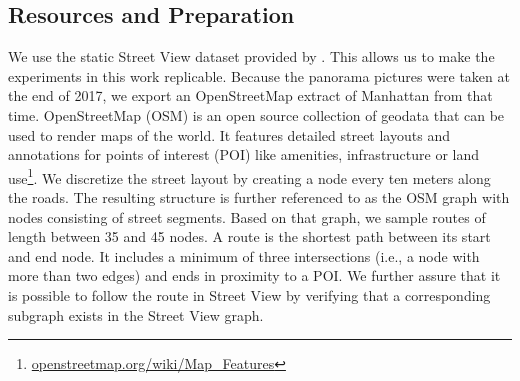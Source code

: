 \documentclass[11pt,a4paper]{article}
\begin{document}
\subsection{Resources and Preparation}
\label{sec:res_and_prep}
We use the static Street View dataset provided by \citet{chen-etal-2019-touchdown}. This allows us to make the experiments in this work replicable. Because the panorama pictures were taken at the end of 2017, we export an OpenStreetMap extract of Manhattan from that time. OpenStreetMap (OSM) is an open source collection of geodata that can be used to render maps of the world. It features detailed street layouts and annotations for points of interest (POI) like amenities, infrastructure or land use\footnote{\url{openstreetmap.org/wiki/Map_Features}}.
We discretize the street layout by creating a node every ten meters along the roads. The resulting structure is further referenced to as the OSM graph with nodes consisting of street segments. Based on that graph, we sample routes of length between 35 and 45 nodes. A route is the shortest path between its start and end node. It includes a minimum of three intersections (i.e., a node with more than two edges) and ends in proximity to a POI. We further assure that it is possible to follow the route in Street View by verifying that a corresponding subgraph exists in the Street View graph.
\end{document}
